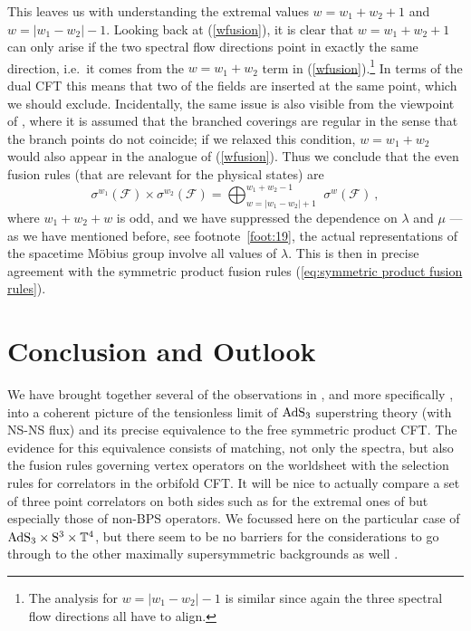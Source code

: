 \documentclass[12pt,a4paper]{article}
\newcommand{\be}{\begin{equation}}
\newcommand{\ee}{\end{equation}}
\begin{document}
This leaves us with understanding the extremal values $w=w_1+w_2+1$ and $w=|w_1-w_2|-1$. Looking back at (\ref{wfusion}), it is clear that $w=w_1+w_2+1$ can only arise if the two spectral flow directions point in exactly the same direction, i.e.\ it comes from the $w=w_1+w_2$ term in (\ref{wfusion}).\footnote{The analysis for $w=|w_1-w_2|-1$ is similar since again the three spectral flow directions all have to align.} In terms of the dual CFT this means that two of the fields are inserted at the same point, which we should exclude. Incidentally, the same issue is also visible from the viewpoint of \cite{Pakman:2009zz, Pakman:2009ab}, where it is assumed that the branched coverings are regular in the sense that the branch points do not coincide; if we relaxed this condition, $w=w_1+w_2$ would also appear in the analogue of (\ref{wfusion}). Thus we conclude that the even fusion rules (that are relevant for the physical states) are
\be\label{wfusion1}
\sigma^{w_1}(\mathscr{F}) \times \sigma^{w_2}(\mathscr{F})
=  \bigoplus_{w=|w_1-w_2|+1}^{w_1 + w_2-1} \, 
\ \sigma^{w}(\mathscr{F}) \ ,
\ee
where $w_1+w_2+w$ is odd, and we have suppressed the dependence on $\lambda$ and $\mu$ --- as we have mentioned before, see footnote~\ref{foot:19}, the actual representations of the spacetime M\"obius group involve all values of $\lambda$. 
This is then in precise agreement with the symmetric product fusion rules  (\ref{eq:symmetric product fusion rules}). 













\section{Conclusion and Outlook}

We have brought together several of the observations in  \cite{Gaberdiel:2017oqg, Ferreira:2017pgt},  and more specifically \cite{Gaberdiel:2018rqv}, into a coherent picture of the tensionless limit of 
${\rm AdS}_3$ superstring theory (with NS-NS flux) and its precise equivalence to the free symmetric product CFT. The evidence for this equivalence consists of matching, not only the spectra, but also the fusion rules governing vertex operators on the worldsheet with the selection rules for correlators in the  orbifold CFT. It will be nice to actually compare a set of three point correlators on both sides such as for the extremal ones of \cite{Pakman:2009ab} but especially those of non-BPS operators. We focussed here on the particular case of  ${\rm AdS}_3\times {\rm S}^3\times \mathbb{T}^4$, but there seem to be no barriers for the considerations to go through to the other maximally supersymmetric  backgrounds as well \cite{EGprog}.
\end{document}

